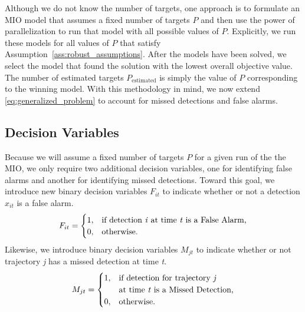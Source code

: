 Although we do not know the number of targets, one approach is to formulate an MIO model that assumes a fixed number of targets $P$ and then use the power of parallelization to run that model with all possible values of $P$. Explicitly, we run these models for all values of $P$ that satisfy Assumption~\ref{ass:robust_assumptions}. After the models have been solved, we select the model that found the solution with the lowest overall objective value. The number of estimated targets $P_{\text{estimated}}$ is simply the value of $P$ corresponding to the winning model. With this methodology in mind, we now extend \eqref{eq:generalized_problem} to account for missed detections and false alarms. 

\subsection{Decision Variables}
Because we will assume a fixed number of targets $P$ for a given run of the the MIO, we only require two additional decision variables, one for identifying false alarms and another for identifying missed detections. Toward this goal, we introduce new binary decision variables $F_{it}$ to indicate whether or not a detection $x_{it}$ is a false alarm. 
\[F_{it} = 
\begin{cases}
1, & \text{if detection \textit{i} at time \textit{t} is a False Alarm,}\\
0, & \text{otherwise.}
\end{cases}\]
Likewise, we introduce binary decision variables $M_{jt}$ to indicate whether or not trajectory \textit{j} has a missed detection at time \textit{t}.
\[M_{jt} =
\begin{cases}
1, & \text{if detection for trajectory \textit{j}}\\
   &\text{at time \textit{t} is a Missed Detection,}\\
0, & \text{otherwise.}
\end{cases}\]

